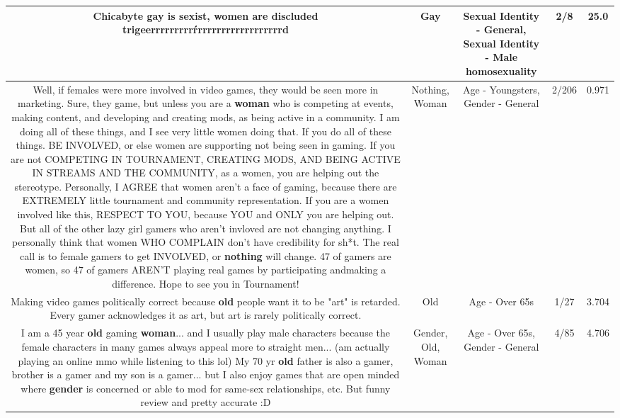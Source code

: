 \documentclass[11pt]{article}
\newlength\mylength
\begin{document}
\begin{center}
\begin{longtable}{|C{.65\mylength}|C{.30\mylength}|C{.12\mylength}|C{.12\mylength}|C{.12\mylength}|}
  \small Chicabyte \textbf{g\textbf{ay}} is sexist, women are discluded trigeerrrrrrrrrŕrrrrrrrrrrrrrrrrrrd\normalsize   & Gay & Sexual Identity - General, Sexual Identity - Male homosexuality & 2/8 & 25.0 \\  \hline
  \small Well, if females were more involved in video games, they would be seen more in marketing. Sure, they game, but unless you are a \textbf{woman} who is competing at events, making content, and developing and creating mods, as being active in a community. I am doing all of these things, and I see very little women doing that. If you do all of these things. BE INVOLVED, or else women are supporting not being seen in gaming. If you are not COMPETING IN TOURNAMENT, CREATING MODS, AND BEING ACTIVE IN STREAMS AND THE COMMUNITY, as a women, you are helping out the stereotype. Personally, I AGREE that women aren't a face of gaming, because there are EXTREMELY little tournament and community representation. If you are a women involved like this, RESPECT TO YOU, because YOU and ONLY you are helping out. But all of the other lazy girl gamers who aren't invloved are not changing anything. I personally think that women WHO COMPLAIN don't have credibility for sh*t. The real call is to female gamers to get INVOLVED, or \textbf{nothing} will change. 47 of gamers are women, so 47 of gamers AREN'T playing real games by participating andmaking a difference. Hope to see you in Tournament!\normalsize   & Nothing, Woman & Age - Youngsters, Gender - General & 2/206 & 0.971 \\  \hline
  \small Making video games politically correct because \textbf{old} people want it to be "art" is retarded. Every gamer acknowledges it as art, but art is rarely politically correct.\normalsize   & Old & Age - Over 65s & 1/27 & 3.704 \\  \hline
  \small I am a 45 year \textbf{old} gaming \textbf{woman}... and I usually play male characters because the female characters in many games always appeal more to straight men... (am actually playing an online mmo while listening to this lol) My 70 yr \textbf{old} father is also a gamer, brother is a gamer and my son is a gamer... but I also enjoy games that are open minded where \textbf{gender} is concerned or able to mod for same-sex relationships, etc. But funny review and pretty accurate :D\normalsize   & Gender, Old, Woman & Age - Over 65s, Gender - General & 4/85 & 4.706 \\  \hline

\end{longtable}
\end{center}
\end{document}
